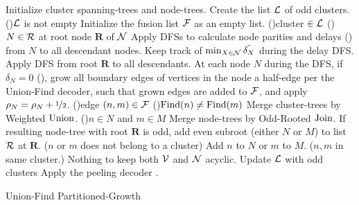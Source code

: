 \begin{algorithm}[htb]
  \BlankLine
  \BlankLine
  Initialize cluster spanning-trees and node-trees.\;\label{algo:B1a}%
  Create the list $\mathcal{L}$ of odd clusters.\;
  \While(){$\mathcal{L}$ is not empty}{
    Initialize the fusion list $\mathcal{F}$ as an empty list.\;\label{algo:B1b}
    \For(){cluster $\in\mathcal{L}$ \label{algo:B2a}}{
      \For(){$N \in\mathcal{R}$ at root node $\mathbf{R}$ of $\mathcal{N}$}{
        Apply DFSs to calculate node parities and delays () from $N$ to all descendant nodes. Keep track of $\min_{X \in \mathcal{N}}{\tilde{\delta_X}}$ during the delay DFS.\;\label{algo:pdc}
      }
      Apply DFS from root $\mathbf{R}$ to all descendants. At each node $N$ during the DFS, if $\delta_N=0$ (), grow all boundary edges of vertices in the node a half-edge per the Union-Find decoder, such that grown edges are added to $\mathcal{F}$, and apply $\rho_N=\rho_N +\nicefrac{1}{2}$. \;\label{algo:grow}
    }
    \For(){edge $(n,m) \in \mathcal{F}$\label{algo:B3a}}{
      \eIf(){$\operatorname{Find}(n)\neq\operatorname{Find}(m)$}{
        Merge cluster-trees by Weighted $\operatorname{Union}$.\;
        \eIf(){$n \in N$ and $m \in M$\label{algo:joina}}{
          Merge node-trees by Odd-Rooted $\operatorname{Join}$. If resulting node-tree with root $\mathbf{R}$ is odd, add even subroot (either $N$ or $M$) to list $\mathcal{R}$ at $\mathbf{R}$.\;
        }($n$ or $m$ does not belong to a cluster){
          Add $n$ to $N$ or $m$ to $M$.\;\label{algo:joinb}
        }
      }($n,m$ in same cluster.\label{algo:dfa}){
        Nothing to keep both $\mathcal{V}$ and $\mathcal{N}$ acyclic.\;\label{algo:dfb} 
      }
    }
    Update $\mathcal{L}$ with odd clusters\; \label{algo:B3b}
  }
  Apply the peeling decoder \cite{delfosse2017linear}.\label{algo:B4a}
  \caption{Union-Find Partitioned-Growth}\label{algo:ufbb}
\end{algorithm}

